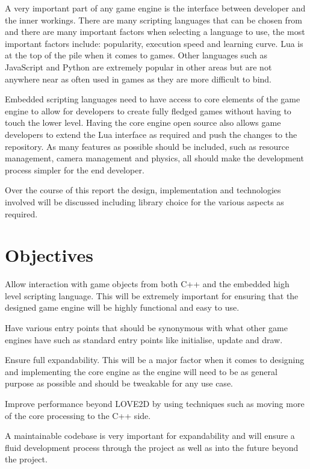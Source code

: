 \documentclass[11pt,a4paper,titlepage]{report}
\begin{document}
	A very important part of any game engine is the interface between developer and the inner workings. There are many scripting languages that can be chosen from and there are many important factors when selecting a language to use, the most important factors include: popularity, execution speed and learning curve. Lua is at the top of the pile when it comes to games. Other languages such as JavaScript and Python are extremely popular in other areas but are not anywhere near as often used in games as they are more difficult to bind.
				
	Embedded scripting languages need to have access to core elements of the game engine to allow for developers to create fully fledged games without having to touch the lower level. Having the core engine open source also allows game developers to extend the Lua interface as required and push the changes to the repository. As many features as possible should be included, such as resource management, camera management and physics, all should make the development process simpler for the end developer.

	Over the course of this report the design, implementation and technologies involved will be discussed including library choice for the various aspects as required.

	\section{Objectives}

	Allow interaction with game objects from both C++ and the embedded high level scripting language. This will be extremely important for ensuring that the designed game engine will be highly functional and easy to use.

	Have various entry points that should be synonymous with what other game engines have such as standard entry points like initialise, update and draw.

	Ensure full expandability. This will be a major factor when it comes to designing and implementing the core engine as the engine will need to be as general purpose as possible and should be tweakable for any use case.

	Improve performance beyond LOVE2D by using techniques such as moving more of the core processing to the C++ side.

	A maintainable codebase is very important for expandability and will ensure a fluid development process through the project as well as into the future beyond the project.
\end{document}
